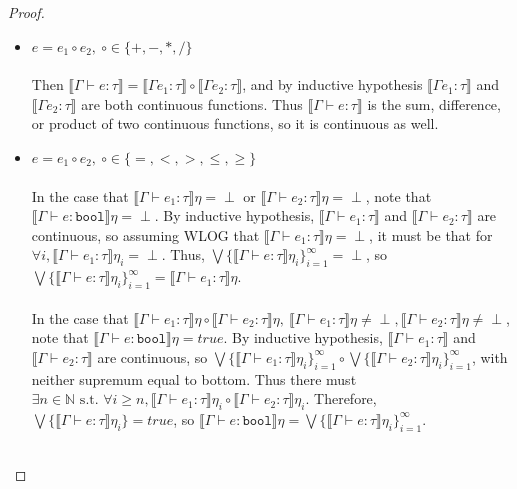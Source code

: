 \documentclass{westhesis}
\theoremstyle{plain}
\theoremstyle{definition}
\begin{document}
\begin{proof}
\begin{itemize}
 \item $e = e_1 \circ e_2, \ \circ \in \{+, -, *, / \}$ \\ \\
 Then $\llbracket \Gamma \vdash e : \tau \rrbracket = \llbracket \Gamma e_1 : \tau \rrbracket \circ \llbracket \Gamma e_2 : \tau 
 \rrbracket$, and by inductive hypothesis $\llbracket \Gamma e_1 : \tau \rrbracket$ and $\llbracket \Gamma e_2 : \tau 
 \rrbracket$ are both continuous functions. Thus $\llbracket \Gamma \vdash e : \tau \rrbracket$ is the sum, difference, or 
 product of two continuous functions, so it is continuous as well. 
  \item $e = e_1 \circ e_2, \ \circ \in \{=,<,>,\leq,\geq\}$\\ \\
  In the case that $\llbracket \Gamma \vdash e_1 : \tau \rrbracket\eta = \perp$ or $\llbracket \Gamma \vdash e_2 : \tau 
  \rrbracket\eta = \perp$, note that $\llbracket \Gamma \vdash e : \texttt{bool}\rrbracket\eta = \perp$. By inductive hypothesis, 
  $\llbracket \Gamma \vdash e_1 : \tau \rrbracket$ and $\llbracket \Gamma \vdash e_2 : \tau \rrbracket$ are continuous, so 
  assuming WLOG that $\llbracket \Gamma \vdash e_1 : \tau \rrbracket\eta = \perp$, it must be that for $\forall i, \llbracket 
  \Gamma \vdash e_1 : \tau \rrbracket\eta_i = \perp$. Thus, $\bigvee\{\llbracket \Gamma \vdash e : \tau \rrbracket\eta_i\}
  ^{\infty}_{i=1} = \perp$, so $\bigvee\{\llbracket \Gamma \vdash e : \tau \rrbracket\eta_i\}
  ^{\infty}_{i=1} = \llbracket \Gamma \vdash e_1 : \tau \rrbracket\eta$.\\ \\
  In the case that $\llbracket \Gamma \vdash e_1 : \tau \rrbracket\eta \circ \llbracket \Gamma \vdash e_2 : \tau \rrbracket\eta, \ 
  \llbracket \Gamma \vdash e_1:\tau \rrbracket\eta \neq \perp, \llbracket \Gamma \vdash e_2 : \tau \rrbracket\eta \neq \perp$, 
  note that $\llbracket \Gamma \vdash e : \texttt{bool}\rrbracket\eta = true$. By inductive hypothesis, $\llbracket 
  \Gamma \vdash e_1 : \tau \rrbracket$ and $\llbracket \Gamma \vdash e_2 : \tau \rrbracket$ are continuous, so $\bigvee\{\llbracket \Gamma \vdash e_1 : \tau \rrbracket\eta_i\}^{\infty}_{i=1} \circ \bigvee\{\llbracket \Gamma \vdash e_2 : \tau \rrbracket\eta_i\}^{\infty}_{i=1}$, with neither supremum equal to bottom. Thus there must $\exists n \in \mathbb{N} \text{ s.t. } \forall i \geq n, \llbracket \Gamma \vdash e_1 : \tau \rrbracket\eta_i \circ
  \llbracket \Gamma \vdash e_2 : \tau \rrbracket\eta_i$. Therefore, $\bigvee\{\llbracket \Gamma \vdash e : \tau \rrbracket\eta_i\} = true$, so $\llbracket \Gamma \vdash e : \texttt{bool}\rrbracket\eta = \bigvee\{\llbracket \Gamma \vdash e : \tau \rrbracket\eta_i\}^{\infty}_{i=1}$. \\ \\

\end{itemize}
\end{proof}
\end{document}
